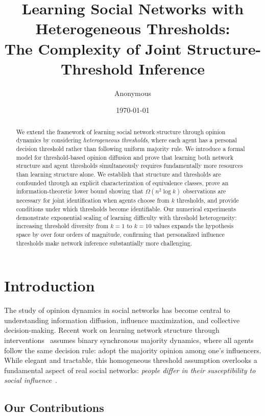 \documentclass[11pt]{article}
\title{Learning Social Networks with Heterogeneous Thresholds: \\
The Complexity of Joint Structure-Threshold Inference}
\author{Anonymous}
\date{\today}
\begin{document}
\maketitle

\begin{abstract}
We extend the framework of learning social network structure through opinion dynamics by considering \emph{heterogeneous thresholds}, where each agent has a personal decision threshold rather than following uniform majority rule. We introduce a formal model for threshold-based opinion diffusion and prove that learning both network structure and agent thresholds simultaneously requires fundamentally more resources than learning structure alone. We establish that structure and thresholds are confounded through an explicit characterization of equivalence classes, prove an information-theoretic lower bound showing that $\Omega(n^2 \log k)$ observations are necessary for joint identification when agents choose from $k$ thresholds, and provide conditions under which thresholds become identifiable. Our numerical experiments demonstrate exponential scaling of learning difficulty with threshold heterogeneity: increasing threshold diversity from $k=1$ to $k=10$ values expands the hypothesis space by over four orders of magnitude, confirming that personalized influence thresholds make network inference substantially more challenging.
\end{abstract}

\section{Introduction}

The study of opinion dynamics in social networks has become central to understanding information diffusion, influence maximization, and collective decision-making. Recent work on learning network structure through interventions~\cite{chistikov2020convergence} assumes binary synchronous majority dynamics, where all agents follow the same decision rule: adopt the majority opinion among one's influencers. While elegant and tractable, this homogeneous threshold assumption overlooks a fundamental aspect of real social networks: \emph{people differ in their susceptibility to social influence}~\cite{granovetter1978threshold}.

\subsection{Our Contributions}
\end{document}
